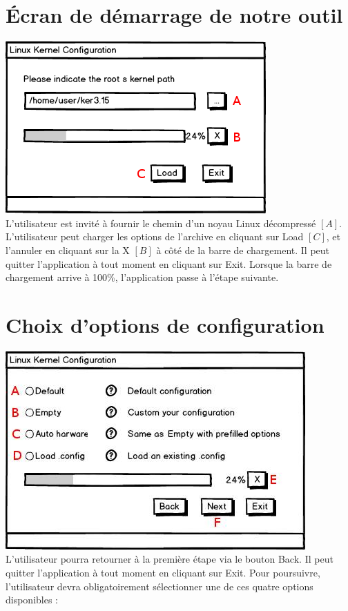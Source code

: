 \documentclass[16pts]{report}
\begin{document}
\section{Écran de démarrage de notre outil}
\label{sec:Écran de démarrage de notre outil}
\includegraphics[scale=0.7]{illustrations/first_dialog_an.png} \\

L'utilisateur est invité à fournir le chemin d'un noyau Linux décompressé $[A]$.
L'utilisateur peut charger les options de l'archive en cliquant sur Load $[C]$,
et l'annuler en cliquant sur la X $[B]$ à côté de la barre de chargement.
Il peut quitter l'application à tout moment en cliquant sur Exit.
Lorsque la barre de chargement arrive à 100\%, l'application passe à l'étape
suivante.


\section{Choix d'options de configuration}
\label{sec:Choix d'options de configuration}
\includegraphics[scale=0.7]{illustrations/choose_dialog_an.jpg} \\

L'utilisateur pourra retourner à la première étape via le bouton Back.
Il peut quitter l'application à tout moment en cliquant sur Exit.
Pour poursuivre, l'utilisateur devra obligatoirement sélectionner une de ces
quatre options disponibles :
\end{document}
